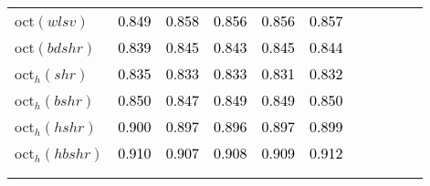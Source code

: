 \begin{tabular}[t]{l|>{}cccc>{}c|ccccc}
oct$(wlsv)$ & \textcolor{black}{0.849} & \textcolor{black}{0.858} & \textcolor{black}{0.856} & \textcolor{black}{0.856} & \textcolor{black}{0.857} &  &  &  &  & \\
oct$(bdshr)$ & \textcolor{black}{0.839} & \textcolor{black}{0.845} & \textcolor{black}{0.843} & \textcolor{black}{0.845} & \textcolor{black}{0.844} &  &  &  &  & \\
oct$_h(shr)$ & \textcolor{black}{0.835} & \textcolor{black}{0.833} & \textcolor{black}{0.833} & \textcolor{black}{0.831} & \textcolor{black}{0.832} &  &  &  &  & \\
oct$_h(bshr)$ & \textcolor{black}{0.850} & \textcolor{black}{0.847} & \textcolor{black}{0.849} & \textcolor{black}{0.849} & \textcolor{black}{0.850} &  &  &  &  & \\
oct$_h(hshr)$ & \textcolor{black}{0.900} & \textcolor{black}{0.897} & \textcolor{black}{0.896} & \textcolor{black}{0.897} & \textcolor{black}{0.899} &  &  &  &  & \\
oct$_h(hbshr)$ & \textcolor{black}{0.910} & \textcolor{black}{0.907} & \textcolor{black}{0.908} & \textcolor{black}{0.909} & \textcolor{black}{0.912} &  &  &  &  & \\[-1.5ex]
\hline\\[-1.5ex]
\bottomrule
{}\\
\end{tabular}
